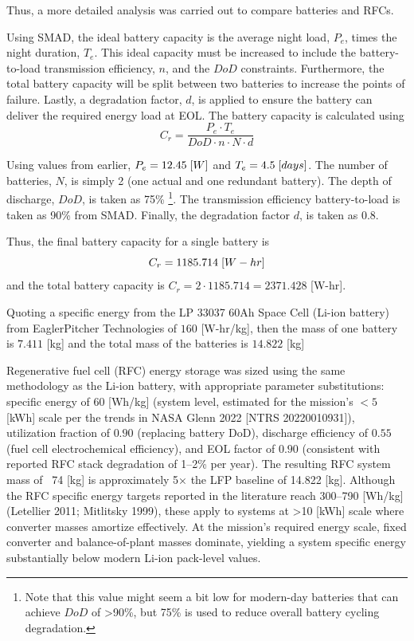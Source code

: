 Thus, a more detailed analysis was carried out to compare batteries and RFCs.

Using SMAD, the ideal battery capacity is the average night load, $P_{e}$, times the night duration, $T_{e}$. This ideal capacity must be increased to include the battery-to-load transmission efficiency, $n$, and the $DoD$ constraints. Furthermore, the total battery capacity will be split between two batteries to increase the points of failure. Lastly, a degradation factor, $d$, is applied to ensure the battery can deliver the required energy load at EOL. The battery capacity is calculated using 
\begin{equation}
    C_{r} = \frac{P_{e}\cdot T_{e}}{DoD\cdot n \cdot N \cdot d}
\end{equation}

Using values from earlier, $P_{e}=12.45 \hspace{1mm}[W]$ and $T_{e}=4.5\hspace{1mm}[days]$. The number of batteries, $N$, is simply 2 (one actual and one redundant battery). The depth of discharge, $DoD$, is taken as 75\% \footnote{Note that this value might seem a bit low for modern-day batteries that can achieve $DoD$ of >90\%, but 75\% is used to reduce overall battery cycling degradation.}. The transmission efficiency battery-to-load is taken as 90\% from SMAD. Finally, the degradation factor $d$, is taken as 0.8.

Thus, the final battery capacity for a single battery is 
\begin{equation}
    C_{r}= 1185.714 \hspace{1mm} [W-hr]
\end{equation}
and the total battery capacity is $C_{r}=2\cdot 1185.714=2371.428$ [W-hr].

Quoting a specific energy from the LP 33037 60Ah Space Cell (Li-ion battery) from EaglerPitcher Technologies of $160$ [W-hr/kg], then the mass of one battery is $7.411$ [kg] and the total mass of the batteries is $14.822$ [kg]

Regenerative fuel cell (RFC) energy storage was sized using the same methodology as the Li-ion battery, with appropriate parameter substitutions: specific energy of $60$ [Wh/kg] (system level, estimated for the mission's $<5$ [kWh] scale per the trends in NASA Glenn 2022 [NTRS 20220010931]), utilization fraction of $0.90$ (replacing battery DoD), discharge efficiency of $0.55$ (fuel cell electrochemical efficiency), and EOL factor of $0.90$ (consistent with reported RFC stack degradation of 1–2\% per year). The resulting RFC system mass of ~74 [kg] is approximately 5× the LFP baseline of 14.822 [kg]. Although the RFC specific energy targets reported in the literature reach 300–790 [Wh/kg] (Letellier 2011; Mitlitsky 1999), these apply to systems at >10 [kWh] scale where converter masses amortize effectively. At the mission's required energy scale, fixed converter and balance-of-plant masses dominate, yielding a system specific energy substantially below modern Li-ion pack-level values.

